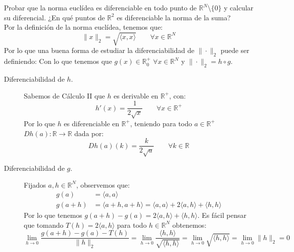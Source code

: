 \begin{ejercicio}
Probar que la norma euclídea es diferenciable en todo punto de \( \mathbb{R}^N \setminus \{0\} \) y calcular su diferencial. ¿En qué puntos de \( \mathbb{R}^2 \) es diferenciable la norma de la suma?\\

\noindent
Por la definición de la norma euclídea, tenemos que:
\begin{equation*}
    \|x\|_2 = \sqrt{\langle x,x \rangle } \qquad \forall x\in \mathbb{R}^N
\end{equation*}
Por lo que una buena forma de estudiar la diferenciabilidad de $\|\cdot\|_2$ puede ser definiendo:
Con lo que tenemos que $g(x) \in \mathbb{R}^+_0$ $\forall x\in \mathbb{R}^N$ y $\|\cdot\|_2 = h\circ g$.
\begin{description}
    \item [Diferenciabilidad de $h$.] Sabemos de Cálculo II que $h$ es derivable en $\mathbb{R}^+$, con:
        \begin{equation*}
            h'(x) = \dfrac{1}{2\sqrt{x}} \qquad \forall x\in \mathbb{R}^+
        \end{equation*}
        Por lo que $h$ es diferenciable en $\mathbb{R}^+$, teniendo para todo $a\in \mathbb{R}^+$ $Dh(a):\mathbb{R}\to \mathbb{R}$ dada por:
        \begin{equation*}
            Dh(a)(k) = \dfrac{k}{2\sqrt{a}} \qquad \forall k\in \mathbb{R}
        \end{equation*}
    \item [Diferenciabilidad de $g$.] Fijados $a,h\in \mathbb{R}^N$, observemos que:
        \begin{align*}
            g(a) &= \langle a,a \rangle  \\
            g(a+h) &= \langle a+h,a+h \rangle  = \langle a,a \rangle  + 2\langle a,h \rangle + \langle h,h \rangle 
        \end{align*}
        Por lo que tenemos $g(a+h)-g(a) = 2\langle a,h \rangle +\langle h,h \rangle $. Es fácil pensar que tomando $T(h) = 2\langle a,h \rangle $ para todo $h\in \mathbb{R}^N$ obtenemos:
        \begin{equation*}
            \lim_{h\to0}\dfrac{g(a+h)-g(a)-T(h)}{\|h\|_2} = \lim_{h\to0}\dfrac{\langle h,h \rangle }{\sqrt{\langle h,h \rangle }} = \lim_{h\to0}\sqrt{\langle h,h \rangle } = \lim_{h\to0}\|h\|_2 = 0
        \end{equation*}

\end{description}
\end{ejercicio}
